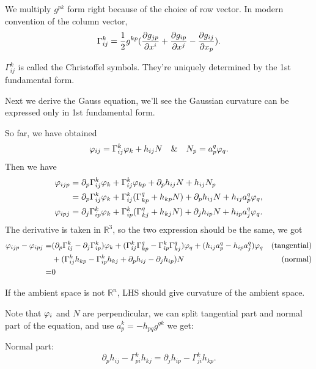 \begin{remark}
    We multiply \(g^{pk}\) form right because of the choice of row vector. In
    modern convention of the column vector, \[
        \Gamma_{ij}^k=\frac{1}{2}g^{kp}(\pdv{g_{jp}}{x^i}+\pdv{g_{ip}}{x^j}
        -\pdv{g_{ij}}{x_{p}})
    .\] 
\end{remark}
\begin{definition}
    \(\Gamma_{ij}^k\) is called the Christoffel symbols. They're uniquely determined
    by the 1st fundamental form.
\end{definition}

Next we derive the Gauss equation, we'll see the Gaussian curvature can be
expressed only in 1st fundamental form.

So far, we have obtained \[
    \varphi_{ij}=\Gamma_{ij}^k\varphi_k+h_{ij}N
    \quad\&\quad
    N_p=a_p^q\varphi_q
.\] Then we have
\begin{align*}
    \varphi_{ijp}&= \partial_p \Gamma_{ij}^k\varphi_k+\Gamma_{ij}^k\varphi_{kp}+
    \partial_p h_{ij} N+h_{ij}N_p \\
    &= \partial_p\Gamma_{ij}^k\varphi_k+\Gamma_{ij}^k(\Gamma_{kp}^q+h_{kp}N)
    +\partial_p h_{ij} N+h_{ij}a_p^q \varphi_q, \\
    \varphi_{ipj}
    &= \partial_j\Gamma_{ip}^k\varphi_k+\Gamma_{ip}^k(\Gamma_{kj}^q+h_{kj}N)
    +\partial_j h_{ip} N+h_{ip}a_j^q \varphi_q
.\end{align*}
The derivative is taken in \(\mathbb{R}^3\), so the two expression should be
the same, we got 
\begin{align*}
    \varphi_{ijp}-\varphi_{ipj}
    =&(\partial_p\Gamma_{ij}^k-\partial_j\Gamma_{ip}^k)\varphi_k+(\Gamma_{ij}^k
    \Gamma_{kp}^q-\Gamma_{ip}^k\Gamma_{kj}^q)\varphi_q+(h_{ij}a_p^q-h_{ip}a_j^q)
    \varphi_q &\text{(tangential)} \\
    &+(\Gamma_{ij}^kh_{kp}-\Gamma_{ip}^kh_{kj}+\partial_p h_{ij}-\partial_{j}
    h_{ip})N &\text{(normal)} \\
    =& 0
\end{align*}
\begin{remark}
    If the ambient space is not \(\mathbb{R}^n\), LHS should give curvature of
    the ambient space.
\end{remark}

Note that \(\varphi_i\) and \(N\) are perpendicular, we can split tangential part
and normal part of the equation, and use \(a_{p}^k=-h_{pq}g^{qk}\) we get:

Normal part:
\begin{equation}\label{eq:codazzi}
    \partial_p h_{ij}-\Gamma_{pi}^kh_{kj}=\partial_j h_{ip}-\Gamma_{ji}^kh_{kp}
.\end{equation}

